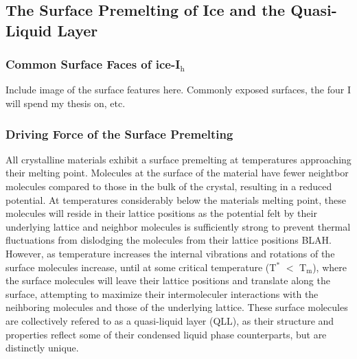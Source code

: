 \subsection{The Surface Premelting of Ice and the Quasi-Liquid Layer}

\subsubsection{Common Surface Faces of ice-I$_\mathrm{h}$}
Include image of the surface features here. Commonly exposed surfaces,
the four I will spend my thesis on, etc.


\subsubsection{Driving Force of the Surface Premelting}
All crystalline materials exhibit a surface premelting at temperatures
approaching their melting point. Molecules at the surface of the
material have fewer neightbor molecules compared to those in the bulk
of the crystal, resulting in a reduced potential. At temperatures
considerably below the materials melting point, these molecules will
reside in their lattice positions as the potential felt by their
underlying lattice and neighbor molecules is sufficiently strong to
prevent thermal fluctuations from dislodging the molecules from their
lattice positions BLAH. However, as temperature increases the internal
vibrations and rotations of the surface molecules increase, until at
some critical temperature (T$^\mathrm{*}$ $<$ T$_\mathrm{m}$), where
the surface molecules will leave their lattice positions and translate
along the surface, attempting to maximize their intermoleculer
interactions with the neihboring molecules and those of the underlying
lattice. These surface molecules are collectively refered to as a
quasi-liquid layer (QLL), as their structure and properties reflect
some of their condensed liquid phase counterparts, but are distinctly
unique.

